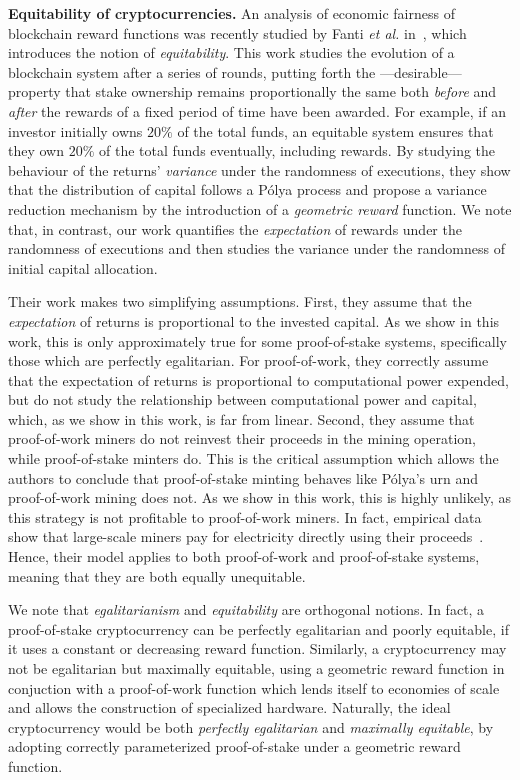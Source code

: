 \noindent\textbf{Equitability of cryptocurrencies.}
An analysis of economic fairness of
blockchain reward functions was recently studied by Fanti \textit{et al.} in~\cite{fanti2018compounding}, which
introduces the notion of \emph{equitability}. This work studies the evolution
of a blockchain system after a series of rounds, putting forth the
---desirable--- property that stake ownership remains proportionally the same
both \emph{before} and \emph{after} the rewards of a fixed period of time have been awarded.
For example, if an
investor initially owns $20\%$ of the total funds, an equitable system ensures that they
own $20\%$ of the total funds eventually, \ie including
rewards. By studying the behaviour of the returns' \emph{variance} under the
randomness of executions, they show that the distribution of capital
follows a Pólya process and propose a variance reduction mechanism
by the introduction of a \emph{geometric reward} function.
We note that, in contrast, our work quantifies the \emph{expectation} of rewards
under the randomness of executions and then studies the variance under the
randomness of initial capital allocation.

Their work makes two simplifying assumptions.
First, they assume that the \emph{expectation} of returns is proportional to the
invested capital. As we show in this work, this is only
approximately true for some proof-of-stake systems, specifically those which are perfectly egalitarian. For proof-of-work, they
correctly assume that the expectation of returns is proportional to computational
power expended, but do not study the relationship between computational power and
capital, which, as we show in this work, is far from linear. Second, they assume that
proof-of-work miners do not reinvest their proceeds in the
mining operation, while proof-of-stake minters do. This is the critical assumption which allows the authors to
conclude that proof-of-stake minting behaves like Pólya's urn and
proof-of-work mining does not. As we show in this work, this
is highly unlikely, as this strategy is not profitable to proof-of-work
miners. In fact, empirical data show that large-scale miners pay for electricity
directly using their proceeds~\cite{kharif2018}. Hence, their model applies to both proof-of-work and
proof-of-stake systems, meaning that they are both equally unequitable.

We note that \emph{egalitarianism} and \emph{equitability} are orthogonal
notions. In fact, a proof-of-stake cryptocurrency can be perfectly egalitarian
and poorly equitable, \eg if it uses a constant or decreasing reward function.
Similarly, a cryptocurrency may not be egalitarian but maximally equitable, \eg
using a geometric reward function in conjuction with a proof-of-work function
which lends itself to economies of scale and allows the construction of
specialized hardware. Naturally, the ideal cryptocurrency would be both
\emph{perfectly egalitarian} and \emph{maximally equitable}, \eg by adopting
correctly parameterized proof-of-stake under a geometric reward function.
